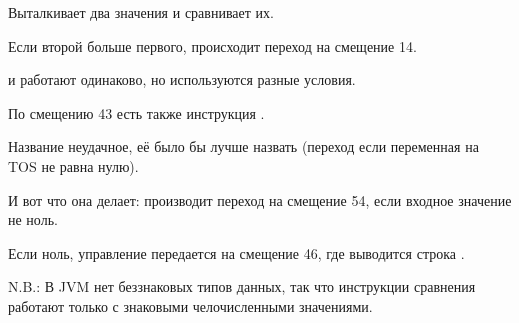  Выталкивает два значения и сравнивает их.

Если второй больше первого, происходит переход на смещение 14.

 и  работают одинаково, но используются разные условия.


По смещению 43 есть также инструкция .

Название неудачное, её было бы лучше назвать  
(переход если переменная на \ac{TOS} не равна нулю).

И вот что она делает: производит переход на смещение 54, если входное значение не ноль.

Если ноль, управление передается на смещение 46, где выводится строка .


N.B.: В \ac{JVM} нет беззнаковых типов данных, так что инструкции сравнения работают
только с знаковыми челочисленными значениями.
